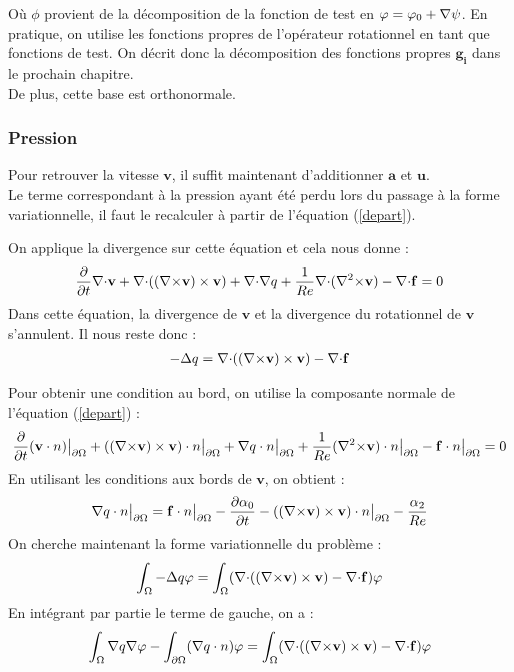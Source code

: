 Où $\phi$ provient de la décomposition de la fonction de test en $\varphi=\varphi_0+{\nabla}\psi$. En pratique, on utilise les fonctions propres de l'opérateur rotationnel en tant que fonctions de test.
On décrit donc la décomposition des fonctions propres $\mathbf{g_i}$ dans le prochain chapitre.\\
De plus, cette base est orthonormale.

\subsubsection{Pression}
\label{pression}

Pour retrouver la vitesse $\mathbf{v}$, il suffit maintenant d'additionner $\mathbf{a}$ et $\mathbf{u}$.\\
Le terme correspondant à la pression ayant été perdu lors du passage à la forme variationnelle, il faut le recalculer à partir de l'équation (\ref{depart}).

On applique la divergence sur cette équation et cela nous donne :
\[
\frac{\partial}{\partial t}{\nabla\cdot} \mathbf{v} + {\nabla\cdot}(({\nabla\times} \mathbf{v})\times \mathbf{v}) + {\nabla\cdot}{\nabla} q + \frac{1}{Re}{\nabla\cdot}({\nabla^2\times} \mathbf{v}) - {\nabla\cdot} \mathbf{f} = 0
\]
Dans cette équation, la divergence de $\mathbf{v}$ et la divergence du rotationnel de $\mathbf{v}$ s'annulent. Il nous reste donc :
\begin{eqnarray}
\label{q}
-{\Delta} q = {\nabla\cdot}(({\nabla\times} \mathbf{v})\times \mathbf{v}) - {\nabla\cdot} \mathbf{f}
\end{eqnarray}

Pour obtenir une condition au bord, on utilise la composante normale de l'équation (\ref{depart}) :
\[
\frac{\partial}{\partial t}(\mathbf{v}\cdot n){\big\rvert_{\partial\Omega}} + (({\nabla\times} \mathbf{v})\times \mathbf{v})\cdot n{\big\rvert_{\partial\Omega}} + {\nabla} q\cdot n{\big\rvert_{\partial\Omega}} +\frac{1}{Re}({\nabla^2\times} \mathbf{v})\cdot n{\big\rvert_{\partial\Omega}} - \mathbf{f}\cdot n{\big\rvert_{\partial\Omega}} = 0
\]
En utilisant les conditions aux bords de $\mathbf{v}$, on obtient :
\[
{\nabla} q\cdot n{\big\rvert_{\partial\Omega}} =  \mathbf{f}\cdot n{\big\rvert_{\partial\Omega}} - \frac{\partial\alpha_0}{\partial t} - (({\nabla\times} \mathbf{v})\times \mathbf{v})\cdot n{\big\rvert_{\partial\Omega}} - \frac{\alpha_2}{Re}
\]
On cherche maintenant la forme variationnelle du problème :
\[
\int_\Omega -{\Delta} q\varphi = \int_\Omega ({\nabla\cdot}(({\nabla\times} \mathbf{v})\times \mathbf{v}) -{\nabla\cdot} \mathbf{f})\varphi
\]
En intégrant par partie le terme de gauche, on a :
\[
\int_\Omega {\nabla} q{\nabla}\varphi - \int_{\partial\Omega} ({\nabla} q\cdot n)\varphi = \int_\Omega ({\nabla\cdot}(({\nabla\times} \mathbf{v})\times \mathbf{v}) -{\nabla\cdot} \mathbf{f})\varphi
\]


